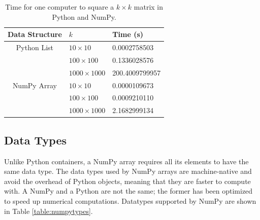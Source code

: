 \begin{table}
 \begin{tabular}{|c|l|l|} \hline Data Structure & $k$ & Time (s) \\ \hline 
 Python List  	& $10\times10$ 	& 0.0002758503 \\ 
 \cline{2-3} 	& $100\times100$ 	& 0.1336028576 \\ 
 \cline{2-3} 	& $1000\times1000$ & 200.4009799957 \\ 
\hline \hline 
 NumPy Array 	& $10\times10$ 	& 0.0000109673 \\
 \cline{2-3} 	& $100\times100$ 	& 0.0009210110 \\ 
 \cline{2-3} 	& $1000\times1000$ & 2.1682999134 \\
 \hline \end{tabular}
 \caption{Time for one computer to square a $k \times k$ matrix in Python and NumPy.}
\label{table:square_times} 
\end{table}
 
 
% 



\subsection*{Data Types}
Unlike Python containers, a NumPy array requires all its elements to have the same data type. 
The data types used by NumPy arrays are machine-native and avoid the overhead of Python objects, meaning that they are faster to compute with. 
A NumPy  and a Python  are not the same; the former has been optimized to speed up numerical computations. 
Datatypes supported by NumPy are shown in Table \ref{table:numpytypes}.

